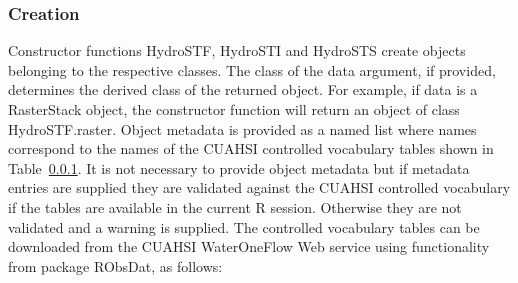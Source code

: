 \documentclass{icldt}\usepackage[]{graphicx}\usepackage[]{color}
\makeatletter
\newenvironment{kframe}{%
 \def\at@end@of@kframe{}%
 \ifinner\ifhmode%
  \def\at@end@of@kframe{\end{minipage}}%
  \begin{minipage}{\columnwidth}%
 \fi\fi%
 \def\FrameCommand##1{\hskip\@totalleftmargin \hskip-\fboxsep
 \colorbox{shadecolor}{##1}\hskip-\fboxsep
     \hskip-\linewidth \hskip-\@totalleftmargin \hskip\columnwidth}%
 \MakeFramed {\advance\hsize-\width
   \@totalleftmargin\z@ \linewidth\hsize
   \@setminipage}}%
 {\par\unskip\endMakeFramed%
 \at@end@of@kframe}
\newenvironment{knitrout}{}{} %
\makeatother
\begin{document}
\subsubsection{Creation}
Constructor functions HydroSTF, HydroSTI and HydroSTS create objects belonging to the respective classes. The class of the data argument, if provided, determines the derived class of the returned object. For example, if data is a RasterStack object, the constructor function will return an object of class HydroSTF.raster. Object metadata is provided as a named list where names correspond to the names of the CUAHSI controlled vocabulary tables shown in Table~\ref{}. It is not necessary to provide object metadata but if metadata entries are supplied they are validated against the CUAHSI controlled vocabulary if the tables are available in the current R session. Otherwise they are not validated and a warning is supplied. The controlled vocabulary tables can be downloaded from the CUAHSI WaterOneFlow Web service using functionality from package RObsDat, as follows:

\begin{knitrout}
\color{fgcolor}\begin{kframe}


{\ttfamily\noindent\itshape\color{messagecolor}{\#\# Loading required package: methods\\\#\# Loading required package: spacetime\\\#\# Loading required package: raster\\\#\# Loading required package: sp}}\end{kframe}
\end{knitrout}
\end{document}
